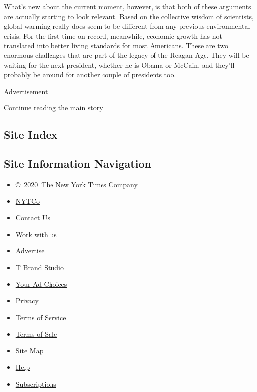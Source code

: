 What's new about the current moment, however, is that both of these
arguments are actually starting to look relevant. Based on the
collective wisdom of scientists, global warming really does seem to be
different from any previous environmental crisis. For the first time on
record, meanwhile, economic growth has not translated into better living
standards for most Americans. These are two enormous challenges that are
part of the legacy of the Reagan Age. They will be waiting for the next
president, whether he is Obama or McCain, and they'll probably be around
for another couple of presidents too.

Advertisement

\protect\hyperlink{after-bottom}{Continue reading the main story}

\hypertarget{site-index}{%
\subsection{Site Index}\label{site-index}}

\hypertarget{site-information-navigation}{%
\subsection{Site Information
Navigation}\label{site-information-navigation}}

\begin{itemize}
\tightlist
\item
  \href{https://help.nytimes3xbfgragh.onion/hc/en-us/articles/115014792127-Copyright-notice}{©~2020~The
  New York Times Company}
\end{itemize}

\begin{itemize}
\tightlist
\item
  \href{https://www.nytco.com/}{NYTCo}
\item
  \href{https://help.nytimes3xbfgragh.onion/hc/en-us/articles/115015385887-Contact-Us}{Contact
  Us}
\item
  \href{https://www.nytco.com/careers/}{Work with us}
\item
  \href{https://nytmediakit.com/}{Advertise}
\item
  \href{http://www.tbrandstudio.com/}{T Brand Studio}
\item
  \href{https://www.nytimes3xbfgragh.onion/privacy/cookie-policy\#how-do-i-manage-trackers}{Your
  Ad Choices}
\item
  \href{https://www.nytimes3xbfgragh.onion/privacy}{Privacy}
\item
  \href{https://help.nytimes3xbfgragh.onion/hc/en-us/articles/115014893428-Terms-of-service}{Terms
  of Service}
\item
  \href{https://help.nytimes3xbfgragh.onion/hc/en-us/articles/115014893968-Terms-of-sale}{Terms
  of Sale}
\item
  \href{https://spiderbites.nytimes3xbfgragh.onion}{Site Map}
\item
  \href{https://help.nytimes3xbfgragh.onion/hc/en-us}{Help}
\item
  \href{https://www.nytimes3xbfgragh.onion/subscription?campaignId=37WXW}{Subscriptions}
\end{itemize}
